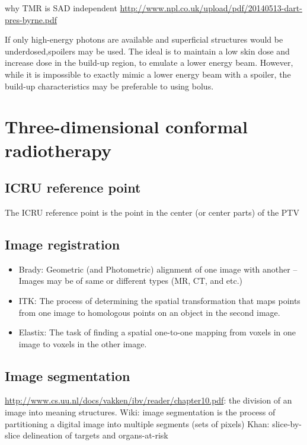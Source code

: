 \documentclass[]{book}
\providecommand{\tightlist}{%
  \setlength{\itemsep}{0pt}\setlength{\parskip}{0pt}}
\theoremstyle{definition}
\theoremstyle{definition}
\theoremstyle{definition}
\theoremstyle{remark}
\begin{document}
why TMR is SAD independent
\url{http://www.npl.co.uk/upload/pdf/20140513-dart-pres-byrne.pdf}

If only high-energy photons are available and superficial structures
would be underdosed,spoilers may be used. The ideal is to maintain a low
skin dose and increase dose in the build-up region, to emulate a lower
energy beam. However, while it is impossible to exactly mimic a lower
energy beam with a spoiler, the build-up characteristics may be
preferable to using bolus.

\chapter{Three-dimensional conformal radiotherapy}\label{crt}

\section{ICRU reference point}\label{icru-reference-point}

The ICRU reference point is the point in the center (or center parts) of
the PTV

\section{Image registration}\label{image-registration}

\begin{itemize}
\tightlist
\item
  Brady: Geometric (and Photometric) alignment of one image with another
  -- Images may be of same or different types (MR, CT, and etc.)
\item
  ITK: The process of determining the spatial transformation that maps
  points from one image to homologous points on an object in the second
  image.
\item
  Elastix: The task of finding a spatial one-to-one mapping from voxels
  in one image to voxels in the other image.
\end{itemize}

\section{Image segmentation}\label{image-segmentation}

\url{http://www.cs.uu.nl/docs/vakken/ibv/reader/chapter10.pdf}: the
division of an image into meaning structures. Wiki: image segmentation
is the process of partitioning a digital image into multiple segments
(sets of pixels) Khan: slice-by-slice delineation of targets and
organs-at-risk
\end{document}
